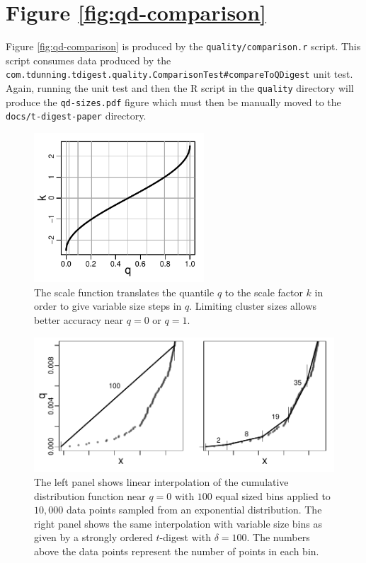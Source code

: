 \documentclass[]{statsoc}
\begin{document}
\section{Figure \ref{fig:qd-comparison}}
Figure \ref{fig:qd-comparison} is produced by the {\tt quality/comparison.r} script. This script consumes data produced by the {\tt com.tdunning.tdigest.quality.ComparisonTest\#compareToQDigest} unit test. Again, running the unit test and then the R script in the {\tt quality} directory will produce the {\tt qd-sizes.pdf} figure which must then be manually moved to the {\tt docs/t-digest-paper} directory.
\begin{figure}[p] %
   \centering
   \includegraphics[width=2.5in]{k-q-plot.pdf} 
   \caption{The scale function translates the quantile $q$ to the scale factor $k$ in order to give variable size steps in $q$. Limiting cluster sizes allows better accuracy near $q=0$ or $q=1$. }
   \label{fig:k-q-plot}
\end{figure}
\begin{figure}[p] %
   \centering
   \includegraphics[height=2.in, clip]{linear-interpolation.pdf} 
   \caption{The left panel shows linear interpolation of the cumulative distribution function near $q=0$ with $100$ equal sized bins applied to $10,000$ data points sampled from an exponential distribution. The right panel shows the same interpolation with variable size bins as given by a strongly ordered $t$-digest with $\delta=100$. The numbers above the data points represent the number of points in each bin. }
   \label{fig:linear-interpolation}
\end{figure}
\end{document}

